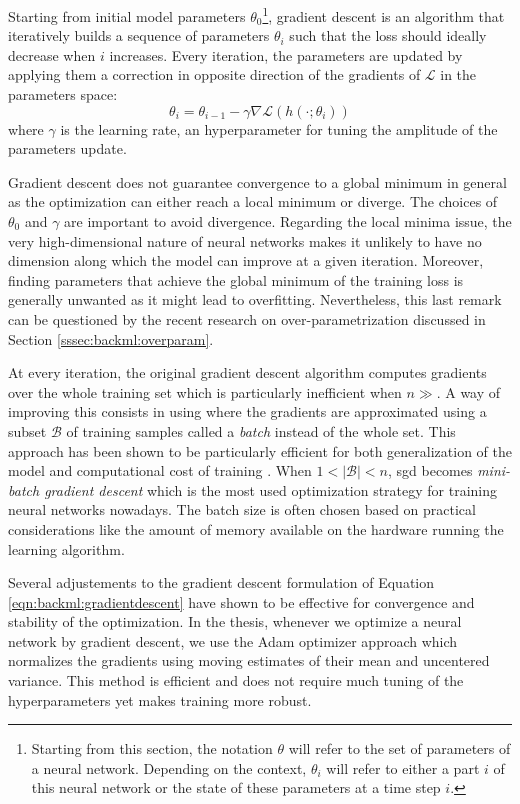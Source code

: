 Starting from initial model parameters $\theta_0$\footnote{Starting from this section, 
the notation $\theta$ will refer to the set of parameters of a neural network. Depending 
on the context, $\theta_i$ will refer to either a part $i$ of this neural network or the state 
of these parameters at a time step $i$.}, gradient descent is an algorithm
that iteratively builds a sequence of parameters $\theta_i$ such that the loss
should ideally decrease when $i$ increases. Every iteration, the parameters are
updated by applying them a correction in opposite direction of the gradients of
$\mathcal{L}$ in the parameters space:
\begin{equation}
\label{eqn:backml:gradientdescent}
\theta_{i} = \theta_{i-1} - \gamma \nabla \mathcal{L}(h(\cdot; \theta_{i}))
\end{equation}
where $\gamma$ is the learning rate, an hyperparameter for tuning the amplitude
of the parameters update.

Gradient descent does not guarantee convergence to a global minimum in general as
the optimization can either reach a local minimum or diverge. The choices of
$\theta_0$ and $\gamma$ are important to avoid divergence. Regarding the local
minima issue, the very high-dimensional nature of neural networks makes it unlikely
to have no dimension along which the model can improve at a given iteration.
Moreover, finding parameters that achieve the global minimum of the training loss
is generally unwanted as it might lead to overfitting. Nevertheless, this last remark can be 
questioned by the recent research on over-parametrization discussed in Section 
\ref{sssec:backml:overparam}.

At every iteration, the original gradient descent algorithm computes gradients
over the whole training set which is particularly inefficient when $n \gg$. A
way of improving this consists in using  where the gradients are
approximated using a subset $\mathcal{B}$ of training samples called a \textit{batch}
instead of the whole set. This approach has been shown to be particularly efficient
for both generalization of the model and computational cost of training
\cite{bottou201113}. When $1 < |\mathcal{B}| < n$, \acrshort{sgd} becomes
\textit{mini-batch gradient descent} which is the most used optimization strategy
for training neural networks nowadays. The batch size is often chosen based on
practical considerations like the amount of memory available on the hardware
running the learning algorithm.

Several adjustements to the gradient descent formulation of Equation
\ref{eqn:backml:gradientdescent} have shown to be effective for convergence and
stability of the optimization. In the thesis, whenever we optimize a neural network
by gradient descent, we use the Adam optimizer \cite{kingma2014adam} approach
which normalizes the gradients using moving estimates of their mean and uncentered
variance. This method is efficient and does not require much tuning of the
hyperparameters yet makes training more robust.

